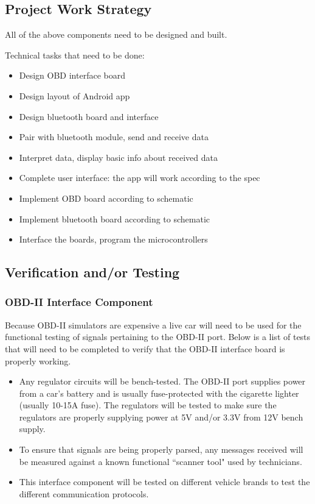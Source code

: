 \documentclass[12pt,letterpaper]{article}
\begin{document}
\subsection{Project Work Strategy}

All of the above components need to be designed and built. 

Technical tasks that need to be done:

\begin{itemize}
\item Design OBD interface board
\item Design layout of Android app
\item Design bluetooth board and interface
\item Pair with bluetooth module, send and receive data
\item Interpret data, display basic info about received data
\item Complete user interface: the app will work according to the spec
\item Implement OBD board according to schematic
\item Implement bluetooth board according to schematic
\item Interface the boards, program the microcontrollers
\end{itemize}

\subsection{Verification and/or Testing}
\subsubsection{OBD-II Interface Component}
Because OBD-II simulators are expensive a live car will need to be used for the functional testing of signals pertaining to the OBD-II port. Below is a list of tests that will need to be completed to verify that the OBD-II interface board is properly working.

\begin{itemize}
\item Any regulator circuits will be bench-tested. The OBD-II port supplies power from a car's battery and is usually fuse-protected with the cigarette lighter (usually 10-15A fuse). The regulators will be tested to make sure the regulators are properly supplying power at 5V and/or 3.3V from 12V bench supply.
\item To ensure that signals are being properly parsed, any messages received will be measured against a known functional ``scanner tool" used by technicians.
\item This interface component will be tested on different vehicle brands to test the different communication protocols.
\end{itemize}
\end{document}
